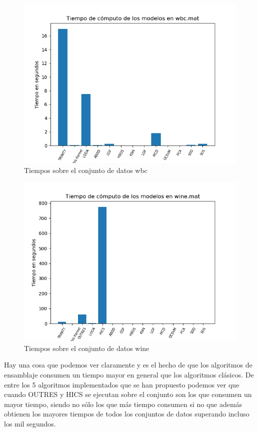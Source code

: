 \begin{figure}[H]
	\centering
	\includegraphics[scale=0.7]{imagenes/imgs-exp1/times/wbc}
	\caption{Tiempos sobre el conjunto de datos wbc}
	\label{wbc_times}
\end{figure}

\begin{figure}[H]
	\centering
	\includegraphics[scale=0.7]{imagenes/imgs-exp1/times/wine}
	\caption{Tiempos sobre el conjunto de datos wine}
	\label{wine_times}
\end{figure}

Hay una cosa que podemos ver claramente y es el hecho de que los algoritmos de ensamblaje consumen un tiempo mayor en general que los algoritmos clásicos. De entre los 5 algoritmos implementados que se han propuesto podemos ver que cuando OUTRES y HICS se ejecutan sobre el conjunto son los que consumen un mayor tiempo, siendo no sólo los que más tiempo consumen si no que además obtienen los mayores tiempos de todos los conjuntos de datos superando incluso los mil segundos.

